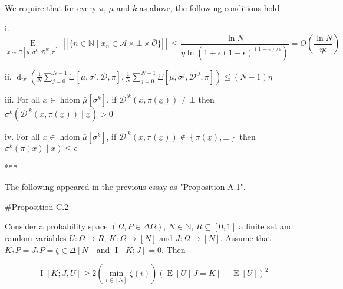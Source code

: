 \documentclass[a4paper]{article}
\newcommand{\AC}[1]{\left\{#1\right\}}
\newcommand{\E}[1]{\underset{#1}{\operatorname{E}}}
\newcommand{\I}[1]{\underset{#1}{\operatorname{I}}}
\newcommand{\Dtv}{\operatorname{d}_{\text{tv}}}
\newcommand{\Nats}{\mathbb{N}}
\newcommand{\Abs}[1]{\left\vert #1 \right\vert}
\newcommand{\Ob}{\mathcal{O}}
\newcommand{\A}{\mathcal{A}}
\DeclareMathOperator{\HD}{hdom}
\newcommand{\Dl}{\mathcal{D}}
\newcommand{\J}{J}
\begin{document}
We require that for every $\pi$, $\mu$ and $k$ as above, the following conditions hold

i. $$\E{x \sim\Xi\left[\mu,\sigma^k,\Dl^{!k},\pi\right]}\left[\Abs{\{n \in \Nats \mid x_n \in \A \times \bot \times \bar{\Ob}\}}\right] \leq \frac{\ln N}{\eta \ln\left(1 + \epsilon(1-\epsilon)^{(1-\epsilon)/\epsilon}\right)}=O\left(\frac{\ln N}{\eta \epsilon}\right)$$

ii. $\Dtv\left(\frac{1}{N}\sum_{j=0}^{N-1}{\Xi\left[\mu,\sigma^j,\Dl,\pi\right]},\frac{1}{N}\sum_{j=0}^{N-1}{\Xi\left[\mu,\sigma^j,\Dl^{!j},\pi\right]}\right) \leq (N-1)\eta$

iii. For all $x \in \HD{\bar{\mu}[\sigma^k]}$, if $\Dl^{!k}\left(x,\pi\left(\underline{x}\right)\right) \ne \bot$ then $\sigma^k\left(\Dl^{!k}\left(x,\pi\left(\underline{x}\right)\right) \mid \underline{x}\right) > 0$

iv. For all $x \in \HD{\bar{\mu}[\sigma^k]}$, if $\Dl^{!k}\left(x,\pi\left(\underline{x}\right)\right) \not\in \AC{\pi\left(\underline{x}\right), \bot}$ then $\sigma^k\left(\pi\left(\underline{x}\right) \mid \underline{x}\right) \leq \epsilon$

***

The following appeared in the previous essay as "Proposition A.1".

\#Proposition C.2

Consider a probability space $(\Omega, P \in \Delta\Omega)$, $N \in \Nats$, $R \subseteq [0,1]$ a finite set and random variables $U: \Omega \rightarrow R$, $K: \Omega \rightarrow [N]$ and $\J: \Omega \rightarrow [N]$. Assume that $K_*P = J_*P = \zeta \in \Delta[N]$ and $\I{}[K;J] = 0$. Then

$$\I{}\left[K;J,U\right] \geq 2 \left(\min_{i \in [N]} {\zeta(i)}\right) \left(\E{}\left[U \mid J = K\right]-\E{}\left[U\right]\right)^2$$
\end{document}
